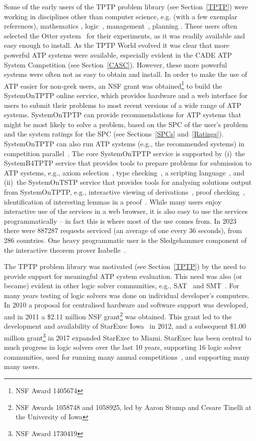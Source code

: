 \documentclass[runningheads]{llncs}
\begin{document}
Some of the early users of the TPTP problem library (see Section~\ref{TPTP}) were working in
disciplines other than computer science, e.g. (with a few exemplar references), mathematics 
\cite{Qua92-Book,MP96}, logic~\cite{GO86,Jec95}, management~\cite{PB+92-TR,PM94}, planning 
\cite{SE94}.
These users often selected the Otter system~\cite{McC03-Otter} for their experiments, as
it was readily available and easy enough to install. 
As the TPTP World evolved it was clear that more powerful ATP systems were available, especially 
evident in the CADE ATP System Competition (see Section~\ref{CASC}).
However, these more powerful systems were often not as easy to obtain and install.
In order to make the use of ATP easier for non-geek users, an NSF grant was obtained\footnote{%
NSF Award 1405674} to build the SystemOnTPTP online service, which provides hardware and a web 
interface for users to submit their problems to most recent versions of a wide range of ATP 
systems.
SystemOnTPTP can provide recommendations for ATP systems that might be most likely to solve
a problem, based on the SPC of the user's problem and the system ratings for the SPC
(see Sections~\ref{SPCs} and~\ref{Ratings}). 
SystemOnTPTP can also run ATP systems (e.g., the recommended systems) in competition
parallel~\cite{SS99-FLAIRS}.
The core SystemOnTPTP service is supported by (i)~the SystemB4TPTP service that provides tools to
prepare problems for submission to ATP systems, e.g., axiom selection~\cite{HV11}, type 
checking~\cite{KSR16}, a scripting language~\cite{Sut14}, and (ii)~the SystemOnTSTP service that 
provides tools for analysing solutions output from SystemOnTPTP, 
e.g., interactive viewing of derivations~\cite{TPS07}, proof checking~\cite{Sut06}, identification 
of interesting lemmas in a proof~\cite{PGS06}.
While many users enjoy interactive use of the services in a web browser, it is also easy to use 
the services programmatically -- in fact this is where most of the use comes from.
In 2023 there were 887287 requests serviced (an average of one every 36 seconds), from 286 
countries.
One heavy programmatic user is the Sledgehammer component of the interactive theorem prover
Isabelle~\cite{PB10}.

The TPTP problem library was motivated (see Section~\ref{TPTP}) by the need to provide support
for meaningful ATP system evaluation.
This need was also (or became) evident in other logic solver communities, e.g., 
SAT~\cite{HS00-SATLIB} and SMT~\cite{CSW15}.
For many years testing of logic solvers was done on individual developer's computers. 
In 2010 a proposal for centralised hardware and software support was developed,
and in 2011 a \$2.11 million NSF grant\footnote{%
NSF Awards 1058748 and 1058925, led by Aaron Stump and Cesare Tinelli at the University of Iowa} 
was obtained.
This grant led to the development and availability of StarExec Iowa~\cite{SST14} in 2012,
and a subsequent \$1.00 million grant\footnote{%
NSF Award 1730419} in 2017 expanded StarExec to Miami.
StarExec has been central to much progress in logic solvers over the last 10 years, supporting
16 logic solver communities, used for running many annual competitions~\cite{BB+19}, and 
supporting many many users.
\end{document}
